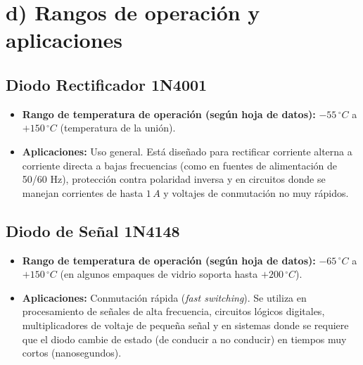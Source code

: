 \documentclass[journal]{IEEEtran}
\begin{document}
\section*{d) Rangos de operación y aplicaciones}

\subsection*{Diodo Rectificador 1N4001}

\begin{itemize}
    \item \textbf{Rango de temperatura de operación (según hoja de datos):} $-55\,^{\circ}C$ a $+150\,^{\circ}C$ (temperatura de la unión).
    \item \textbf{Aplicaciones:} Uso general. Está diseñado para rectificar corriente alterna a 
    corriente directa a bajas frecuencias (como en fuentes de alimentación de 50/60 Hz), 
    protección contra polaridad inversa y en circuitos donde se manejan corrientes de 
    hasta $1\,A$ y voltajes de conmutación no muy rápidos.
\end{itemize}

\subsection*{Diodo de Señal 1N4148}

\begin{itemize}
    \item \textbf{Rango de temperatura de operación (según hoja de datos):} $-65\,^{\circ}C$ a $+150\,^{\circ}C$ 
    (en algunos empaques de vidrio soporta hasta $+200\,^{\circ}C$).
    \item \textbf{Aplicaciones:} Conmutación rápida (\textit{fast switching}). Se utiliza en procesamiento de 
    señales de alta frecuencia, circuitos lógicos digitales, multiplicadores de voltaje de 
    pequeña señal y en sistemas donde se requiere que el diodo cambie de estado (de 
    conducir a no conducir) en tiempos muy cortos (nanosegundos).
\end{itemize}
\end{document}
